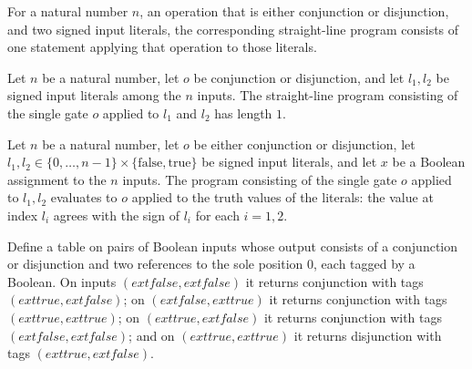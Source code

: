 \begin{definition}
\label{BoolCircuit.oneLine}
\leanok
{}
For a natural number $n$, an operation that is either conjunction or disjunction, and
two signed input literals, the corresponding straight-line program consists of one
statement applying that operation to those literals.
\end{definition}

\begin{theorem}
\label{BoolCircuit.oneLine_length}
\leanok
{}
Let $n$ be a natural number, let $o$ be conjunction or disjunction, and let $l_1,l_2$ be
signed input literals among the $n$ inputs. The straight-line program consisting of the
single gate $o$ applied to $l_1$ and $l_2$ has length $1$.
\end{theorem}

\begin{theorem}
\label{BoolCircuit.oneLine_eval}
\leanok
{}
Let $n$ be a natural number, let $o$ be either conjunction or disjunction, let
$l_1,l_2\in\{0,\ldots,n-1\}\times\{\mathrm{false},\mathrm{true}\}$ be signed input
literals, and let $x$ be a Boolean assignment to the $n$ inputs. The program consisting
of the single gate $o$ applied to $l_1,l_2$ evaluates to $o$ applied to the truth values
of the literals: the value at index $l_i$ agrees with the sign of $l_i$ for each
$i=1,2$.
\end{theorem}

\begin{definition}
\label{BoolCircuit.table1}
\leanok
{}
Define a table on pairs of Boolean inputs whose output consists of a conjunction or
disjunction and two references to the sole position $0$, each tagged by a Boolean. On
inputs $(	ext{false},	ext{false})$ it returns conjunction with tags
$(	ext{true},	ext{false})$; on $(	ext{false},	ext{true})$ it returns conjunction with
tags $(	ext{true},	ext{true})$; on $(	ext{true},	ext{false})$ it returns conjunction
with tags $(	ext{false},	ext{false})$; and on $(	ext{true},	ext{true})$ it returns
disjunction with tags $(	ext{true},	ext{false})$.
\end{definition}


